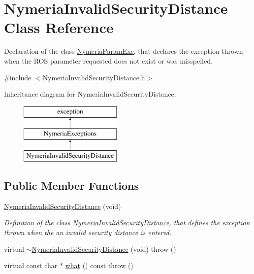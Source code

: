 \hypertarget{class_nymeria_invalid_security_distance}{}\section{Nymeria\+Invalid\+Security\+Distance Class Reference}
\label{class_nymeria_invalid_security_distance}


Declaration of the class \hyperlink{class_nymeria_param_exc}{Nymeria\+Param\+Exc}, that declares the exception thrown when the R\+O\+S parameter requested does not exist or was misspelled.  




{\ttfamily \#include $<$Nymeria\+Invalid\+Security\+Distance.\+h$>$}

Inheritance diagram for Nymeria\+Invalid\+Security\+Distance\+:\begin{figure}[H]
\begin{center}
\leavevmode
\includegraphics[height=3.000000cm]{class_nymeria_invalid_security_distance}
\end{center}
\end{figure}
\subsection*{Public Member Functions}
\begin{DoxyCompactItemize}
\item 
\hyperlink{class_nymeria_invalid_security_distance_a50c42bc95a0d56f9eafd4d9bbadd96ce}{Nymeria\+Invalid\+Security\+Distance} (void)
\begin{DoxyCompactList}\small\item\em Definition of the class \hyperlink{class_nymeria_invalid_security_distance}{Nymeria\+Invalid\+Security\+Distance}, that defines the exception thrown when the an invalid security distance is entered. \end{DoxyCompactList}\item 
virtual \hyperlink{class_nymeria_invalid_security_distance_ac05209ee7fcc2e62ab8da62afab847d3}{$\sim$\+Nymeria\+Invalid\+Security\+Distance} (void)  throw ()
\item 
virtual const char $\ast$ \hyperlink{class_nymeria_invalid_security_distance_ad355d93e206f208f9994079da463ef75}{what} () const   throw ()
\end{DoxyCompactItemize}



